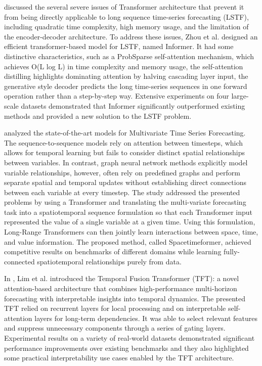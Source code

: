 \cite{Zhou2020} discussed the several severe issues of Transformer architecture that prevent it from being directly applicable to long sequence time-series forecasting (LSTF), including quadratic time complexity, high memory usage, and the limitation of the encoder-decoder architecture.
To address these issues, Zhou et al. designed an efficient transformer-based model for LSTF, named Informer.
It had some distinctive characteristics, such as a ProbSparse self-attention mechanism, which achieves O(L log L) in time complexity and memory usage, the self-attention distilling highlights dominating attention by halving cascading layer input, the generative style decoder predicts the long time-series sequences in one forward operation rather than a step-by-step way.
Extensive experiments on four large-scale datasets demonstrated that Informer significantly outperformed existing methods and provided a new solution to the LSTF problem.

\cite{Grigsby2021} analyzed the state-of-the-art models for Multivariate Time Series Forecasting.
The sequence-to-sequence models rely on attention between timesteps, which allows for temporal learning but fails to consider distinct spatial relationships between variables.
In contrast, graph neural network methods explicitly model variable relationships, however, often rely on predefined graphs and perform separate spatial and temporal updates without establishing direct connections between each variable at every timestep.
The study addressed the presented problems by using a Transformer and translating the multi-variate forecasting task into a spatiotemporal sequence formulation so that each Transformer input represented the value of a single variable at a given time.
Using this formulation, Long-Range Transformers can then jointly learn interactions between space, time, and value information.
The proposed method, called Spacetimeformer, achieved competitive results on benchmarks of different domains while learning fully-connected spatiotemporal relationships purely from data.

In \cite{LIM20211748}, Lim et al. introduced the Temporal Fusion Transformer (TFT): a novel attention-based architecture that combines high-performance multi-horizon forecasting with interpretable insights into temporal dynamics.
The presented TFT relied on recurrent layers for local processing and on interpretable self-attention layers for long-term dependencies.
It was able to select relevant features and suppress unnecessary components through a series of gating layers.
Experimental results on a variety of real-world datasets demonstrated significant performance improvements over existing benchmarks and they also highlighted some practical interpretability use cases enabled by the TFT architecture.

